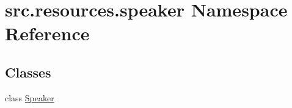 \hypertarget{namespacesrc_1_1resources_1_1speaker}{\section{src.\+resources.\+speaker Namespace Reference}
\label{namespacesrc_1_1resources_1_1speaker}
}
\subsection*{Classes}
\begin{DoxyCompactItemize}
\item 
class \hyperlink{classsrc_1_1resources_1_1speaker_1_1_speaker}{Speaker}
\end{DoxyCompactItemize}
